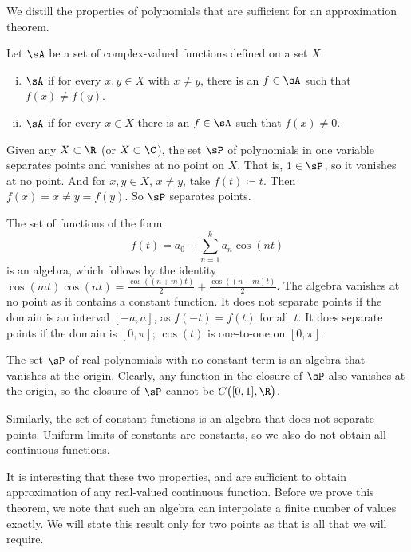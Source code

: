 We distill the properties of polynomials that are sufficient
for an approximation theorem.

\begin{defn}
Let $\sA$ be a set of complex-valued functions defined on a set $X$.
\begin{enumerate}[(i)]
\item $\sA$ \emph{}
if for every $x,y \in X$ with $x \not= y$, there is an $f \in \sA$ such that
$f(x) \not= f(y)$.
\item 
$\sA$ \emph{} if for every $x \in X$
there is an $f \in \sA$ such that $f(x) \not= 0$.
\end{enumerate}
\end{defn}

\begin{example}
Given any $X \subset \R$ (or $X \subset \C$),
the set $\sP$ of polynomials in one variable separates points and vanishes at no point
on $X$.  That is, $1 \in \sP$, so it vanishes at no point.  And for $x,y \in
X$, $x\not= y$, take $f(t) \coloneqq t$.  Then $f(x) = x \not= y = f(y)$.
So $\sP$ separates points.
\end{example}

\begin{example}
The set of functions of the form
\begin{equation*}
f(t) = a_0 + \sum_{n=1}^k a_n \cos(nt)
\end{equation*}
is an algebra,
which follows by the identity $\cos(mt)\cos(nt) = 
\frac{\cos((n+m) t)}{2}+
\frac{\cos((n-m) t)}{2}$.
The algebra vanishes at no point as it contains a constant function.
It does not separate points if the domain is an interval
$[-a,a]$, as $f(-t) = f(t)$ for all~$t$.
It does separate points if the domain is $[0,\pi]$; $\cos(t)$
is one-to-one on $[0,\pi]$.
\end{example}

\begin{example}
The set $\sP$ of real polynomials with no constant term is an algebra that vanishes at the origin.
Clearly, any function in the closure of $\sP$ also vanishes at the origin,
so the closure of $\sP$ cannot be $C\bigl([0,1],\R\bigr)$.

Similarly, the set of constant functions is an algebra that does not
separate points.  Uniform limits of constants are constants, so we also do
not obtain all continuous functions.
\end{example}

It is interesting that these two properties,
 and
 are sufficient to obtain approximation of any
real-valued continuous function.
Before we prove this theorem, we note that such an algebra can interpolate
a finite number of values exactly.  We will state this result
only for two points as that is all that we will require.

